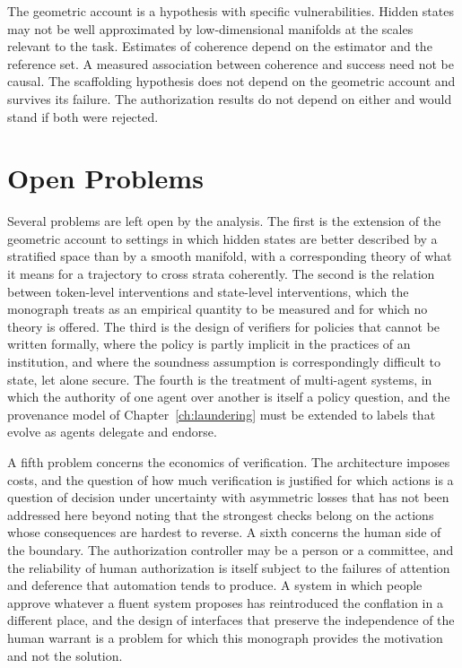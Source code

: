 The geometric account is a hypothesis with specific vulnerabilities. Hidden states may not be well approximated by low-dimensional manifolds at the scales relevant to the task. Estimates of coherence depend on the estimator and the reference set. A measured association between coherence and success need not be causal. The scaffolding hypothesis does not depend on the geometric account and survives its failure. The authorization results do not depend on either and would stand if both were rejected.

\section{Open Problems}

Several problems are left open by the analysis. The first is the extension of the geometric account to settings in which hidden states are better described by a stratified space than by a smooth manifold, with a corresponding theory of what it means for a trajectory to cross strata coherently. The second is the relation between token-level interventions and state-level interventions, which the monograph treats as an empirical quantity to be measured and for which no theory is offered. The third is the design of verifiers for policies that cannot be written formally, where the policy is partly implicit in the practices of an institution, and where the soundness assumption is correspondingly difficult to state, let alone secure. The fourth is the treatment of multi-agent systems, in which the authority of one agent over another is itself a policy question, and the provenance model of Chapter~\ref{ch:laundering} must be extended to labels that evolve as agents delegate and endorse.

A fifth problem concerns the economics of verification. The architecture imposes costs, and the question of how much verification is justified for which actions is a question of decision under uncertainty with asymmetric losses that has not been addressed here beyond noting that the strongest checks belong on the actions whose consequences are hardest to reverse. A sixth concerns the human side of the boundary. The authorization controller may be a person or a committee, and the reliability of human authorization is itself subject to the failures of attention and deference that automation tends to produce. A system in which people approve whatever a fluent system proposes has reintroduced the conflation in a different place, and the design of interfaces that preserve the independence of the human warrant is a problem for which this monograph provides the motivation and not the solution.


